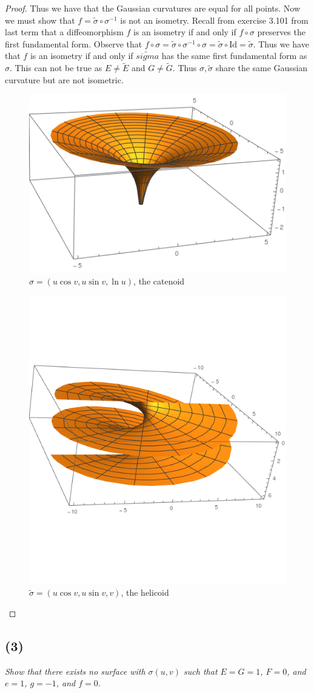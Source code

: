 \documentclass[a4paper, 11pt]{article}
\begin{document}
\begin{proof}
		\noindent Thus we have that the Gaussian curvatures are equal for all points. Now we must show that $f=\tilde{\sigma}\circ\sigma^{-1}$ is not an isometry. Recall from exercise 3.101 from last term that a diffeomorphism $f$ is an isometry if and only if $f\circ\sigma$ preserves the first fundamental form. Observe that $f\circ\sigma = \tilde{\sigma}\circ\sigma^{-1}\circ\sigma=\tilde{\sigma}\circ\text{Id} = \tilde{\sigma}$. Thus we have that $f$ is an isometry if and only if $\tilde{sigma}$ has the same first fundamental form as $\sigma$. This can not be true as $E\neq\tilde{E}$ and $G\neq\tilde{G}$. Thus $\sigma, \tilde{\sigma}$ share the same Gaussian curvature but are not isometric. 
			\begin{figure}[!hbt]
				\centering
				\includegraphics[width=0.4\columnwidth]{Catenoid}
				\caption{$\sigma = (u\cos v, u\sin v, \ln u )$, the catenoid}
			\end{figure}
			\begin{figure}[!hbt]
				\centering
				\includegraphics[width=0.4\columnwidth]{Helicoid}
				\caption{$\tilde{\sigma}=(u\cos v, u\sin v, v)$, the helicoid}
			\end{figure}	
	\end{proof}
	
\subsection*{(3)}
	\textit{Show that there exists no surface with $\sigma(u,v)$ such that $E=G=1$, $F=0$, and $e=1$, $g=-1$, and $f=0$.} 
	
\end{document}
